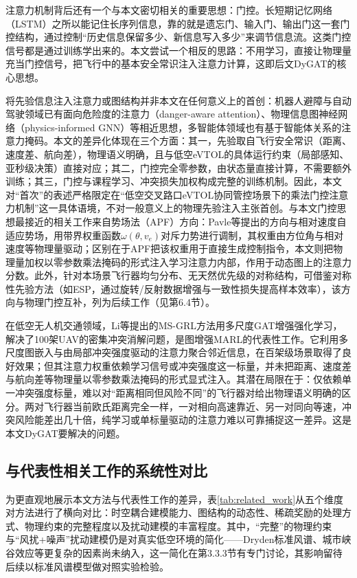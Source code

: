 \documentclass[12pt,a4paper,UTF8]{ctexart}
\begin{document}
注意力机制背后还有一个与本文密切相关的重要思想：门控。长短期记忆网络（LSTM）\cite{ref37}之所以能记住长序列信息，靠的就是遗忘门、输入门、输出门这一套门控结构，通过控制“历史信息保留多少、新信息写入多少”来调节信息流。这类门控信号都是通过训练学出来的。本文尝试一个相反的思路：不用学习，直接让物理量充当门控信号，把飞行中的基本安全常识注入注意力计算，这即后文DyGAT的核心思想。

将先验信息注入注意力或图结构并非本文在任何意义上的首创：机器人避障与自动驾驶领域已有面向危险度的注意力（danger-aware attention）、物理信息图神经网络（physics-informed GNN）等相近思想\cite{ref55}，多智能体领域也有基于智能体关系的注意力掩码。本文的差异化体现在三个方面：其一，先验取自飞行安全常识（距离、速度差、航向差），物理语义明确，且与低空eVTOL的具体运行约束（局部感知、亚秒级决策）直接对应；其二，门控完全零参数，由状态量直接计算，不需要额外训练；其三，门控与课程学习、冲突损失加权构成完整的训练机制。因此，本文对“首次”的表述严格限定在“低空交叉路口eVTOL协同管控场景下的乘法门控注意力机制”这一具体语境，不对一般意义上的物理先验注入主张首创。与本文门控思想最接近的相关工作来自势场法（APF）方向：Pavle等\cite{ref56}提出的方向与相对速度自适应势场，用带界权重函数$\omega(\theta, v_e)$对斥力势进行调制，其权重由方位角与相对速度等物理量驱动；区别在于APF把该权重用于直接生成控制指令，本文则把物理量加权以零参数乘法掩码的形式注入学习注意力内部，作用于动态图上的注意力分数。此外，针对本场景飞行器均匀分布、无天然优先级的对称结构，可借鉴对称性先验方法（如ESP\cite{ref57}，通过旋转/反射数据增强与一致性损失提高样本效率），该方向与物理门控互补，列为后续工作（见第6.4节）。

在低空无人机交通领域，Li等\cite{ref10}提出的MS-GRL方法用多尺度GAT增强强化学习，解决了100架UAV的密集冲突消解问题，是图增强MARL的代表性工作。它利用多尺度图嵌入与由局部冲突强度驱动的注意力聚合邻近信息，在百架级场景取得了良好效果；但其注意力权重依赖学习信号或冲突强度这一标量，并未把距离、速度差与航向差等物理量以零参数乘法掩码的形式显式注入。其潜在局限在于：仅依赖单一冲突强度标量，难以对“距离相同但风险不同”的飞行器对给出物理语义明确的区分。两对飞行器当前欧氏距离完全一样，一对相向高速靠近、另一对同向等速，冲突风险能差出几十倍，纯学习或单标量驱动的注意力难以可靠捕捉这一差异。这是本文DyGAT要解决的问题。

\subsection{与代表性相关工作的系统性对比}

为更直观地展示本文方法与代表性工作的差异，表\ref{tab:related_work}从五个维度对方法进行了横向对比：时空耦合建模能力、图结构的动态性、稀疏奖励的处理方式、物理约束的完整程度以及扰动建模的丰富程度。其中，“完整”的物理约束与“风扰+噪声”扰动建模仍是对真实低空环境的简化——Dryden标准风谱、城市峡谷效应等更复杂的因素尚未纳入，这一简化在第3.3.3节有专门讨论，其影响留待后续以标准风谱模型做对照实验检验。
\end{document}
